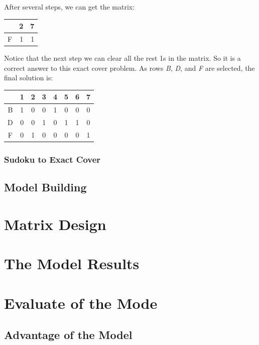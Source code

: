 \documentclass{mcmthesis}
\begin{document}
After several steps, we can get the matrix:\\

\begin{table}[!ht]
\centering
	\begin{tabular}{|r|r|r|}
	\hline
	 & 2 & 7 \\
	 \hline
	 F & 1 & 1 \\
	 \hline
	 \end{tabular}
\end{table}

Notice that the next step we can clear all the rest 1s in the matrix. So it is a correct answer to this exact cover problem. As rows \textit{B}, \textit{D}, and \textit{F} are selected, the final solution is:
\begin{table}[!ht]
\centering
	\begin{tabular}{|c|c|c|c|c|c|c|c|}
	\hline
	  & 1 & 2 & 3 & 4 & 5 & 6 & 7 \\
	  \hline
	B & 1 & 0 & 0 & 1 & 0 & 0 & 0 \\
	\hline
	D & 0 & 0 & 1 & 0 & 1 & 1 & 0 \\
	\hline
	F & 0 & 1 & 0 & 0 & 0 & 0 & 1 \\
	\hline
	\end{tabular}
\end{table}

\subsubsection{Sudoku to Exact Cover}


\subsection{Model Building}


\section{Matrix Design}

\section{The Model Results}


\section{Evaluate of the Mode}
\subsection{Advantage of the Model}
\end{document}
